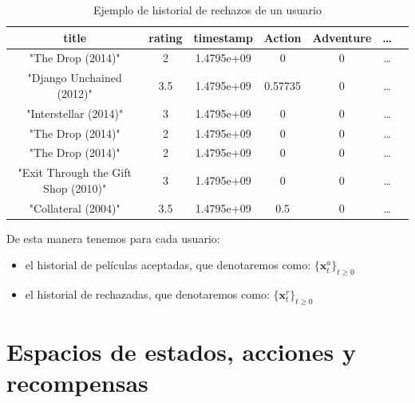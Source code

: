\begin{table}
    
\begin{center}
    \begin{tabular}{|c|c|c|c|c|c|c|}
\hline
\textbf{title}          &              \textbf{rating}  &  \textbf{timestamp}   &    \textbf{Action}   &  \textbf{Adventure} & \dots \\
\hline
"The Drop (2014)"                   &      2   &   1.4795e+09  &       0        & 0  & \dots \\  
"Django Unchained (2012)"           &    3.5   &   1.4795e+09  &       0.57735  & 0  & \dots \\ 
"Interstellar (2014)"               &      3   &   1.4795e+09  &       0        & 0  & \dots \\  
"The Drop (2014)"                   &      2   &   1.4795e+09  &       0        & 0  & \dots \\  
"The Drop (2014)"                   &      2   &   1.4795e+09  &       0        & 0  & \dots \\  
"Exit Through the Gift Shop (2010)" &      3   &   1.4795e+09  &       0        & 0  & \dots \\  
"Collateral (2004)"                 &    3.5   &   1.4795e+09  &       0.5      & 0  & \dots \\  
    \hline
    \end{tabular}
\end{center}
\caption{Ejemplo de historial de rechazos de un usuario}\label{cuadrorec}
\end{table}



De esta manera tenemos para cada usuario:

\begin{itemize}
    \item el historial de películas aceptadas, que denotaremos como: $\{\bm{x}^a_t\}_{t\geq 0}$ 
    \item el historial de rechazadas, que denotaremos como: $\{\bm{x}^r_t \}_{t\geq 0}$
\end{itemize} 


\section{Espacios de estados, acciones y recompensas}

